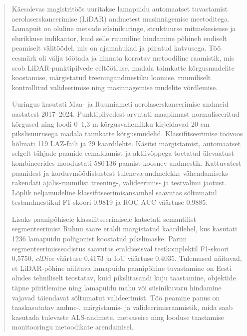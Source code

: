 \newpage
{}

\begin{info}
\begin{abstract}
Käesolevas magistritöös uuritakse lamapuidu automaatset tuvastamist aerolaserskaneerimise (LiDAR) andmetest masinnägemise meetoditega. Lamapuit on oluline metsade süsinikuringe, struktuurse mitmekesisuse ja elurikkuse indikaator, kuid selle ruumiline hindamine põhineb endiselt peamiselt välitöödel, mis on ajamahukad ja piiratud katvusega. Töö eesmärk oli välja töötada ja hinnata korratav metoodiline raamistik, mis seob LiDAR-punktipilvede eeltöötluse, madala taimkatte kõrgusmudelite koostamise, märgistatud treeningandmestiku loomise, ruumiliselt kontrollitud valideerimise ning masinnägemise mudelite võrdlemise.

Uuringus kasutati Maa- ja Ruumiameti aerolaserskaneerimise andmeid aastatest 2017--2024. Punktipilvedest arvutati maapinnast normaliseeritud kõrgused ning loodi 0--1,3 m kõrgusvahemikku kirjeldavad 20 cm pikslisuurusega madala taimkatte kõrgusmudelid. Klassifitseerimise töövoos hõlmati 119 LAZ-faili ja 29 kaardilehte. Käsitsi märgistamist, automaatset selgelt tühjade paanide eemaldamist ja aktiivõppega toetatud ülevaatust kombineerides moodustati 580\,136 paanist koosnev andmestik. Kattuvatest paanidest ja korduvmõõdistustest tuleneva andmelekke vähendamiseks rakendati ajalis-ruumilist treening-, valideerimis- ja testvalimi jaotust. Lõplik neljamudeline klassifitseerimisansambel saavutas sõltumatul testandmestikul F1-skoori 0,9819 ja ROC AUC väärtuse 0,9885.

Lisaks paanipõhisele klassifitseerimisele katsetati semantilist segmenteerimist Ruhnu saare eraldi märgistatud kaardilehel, kus kasutati 1236 lamapuidu polügonist koostatud pikslimaske. Parim segmenteerimisseadistus saavutas eraldiseisval testkomplektil F1-skoori 0,5750, \textit{clDice} väärtuse 0,4173 ja IoU väärtuse 0,4035. Tulemused näitavad, et LiDAR-põhine nähtava lamapuidu paanipõhine tuvastamine on Eesti oludes tehniliselt teostatav, kuid pikslitasandi kuju taastamine, objektide täpne piiritlemine ning lamapuidu mahu või süsinikuvaru hindamine vajavad täiendavat sõltumatut valideerimist. Töö peamine panus on taaskasutatav andme-, märgistamis- ja valideerimisraamistik, mida saab kasutada tulevaste ALS-andmete, metsaseire ning looduse taastamise monitooringu metoodikate arendamisel.
\end{abstract}


\end{info}


